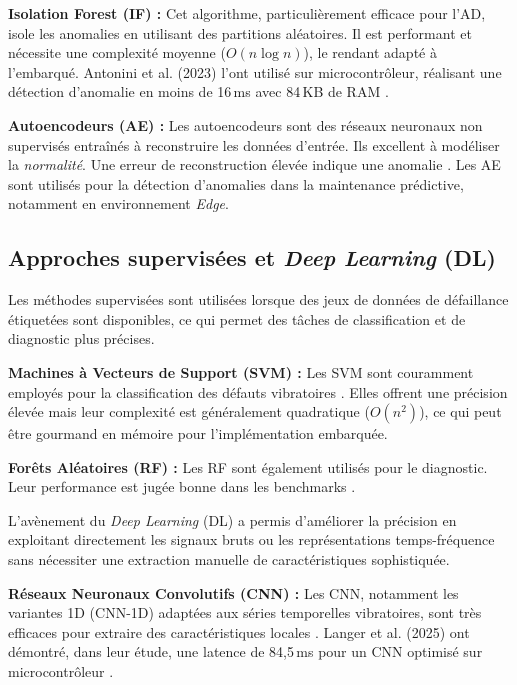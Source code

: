 \textbf{Isolation Forest (IF) :} Cet algorithme, particulièrement efficace pour l'AD, isole les anomalies en utilisant des partitions aléatoires. Il est performant et nécessite une complexité moyenne ($O(n \log n)$), le rendant adapté à l'embarqué. Antonini et al. (2023) l'ont utilisé sur microcontrôleur, réalisant une détection d'anomalie en moins de 16\,ms avec 84\,KB de RAM \cite{antonini2023}.

\textbf{Autoencodeurs (AE) :} Les autoencodeurs sont des réseaux neuronaux non supervisés entraînés à reconstruire les données d'entrée. Ils excellent à modéliser la \textit{normalité}. Une erreur de reconstruction élevée indique une anomalie \cite{ran2019}. Les AE sont utilisés pour la détection d'anomalies dans la maintenance prédictive, notamment en environnement \textit{Edge}.

\subsection{Approches supervisées et \textit{Deep Learning} (DL)}

Les méthodes supervisées sont utilisées lorsque des jeux de données de défaillance étiquetées sont disponibles, ce qui permet des tâches de classification et de diagnostic plus précises.

\textbf{Machines à Vecteurs de Support (SVM) :} Les SVM sont couramment employés pour la classification des défauts vibratoires \cite{jemmali2021,ran2019}. Elles offrent une précision élevée mais leur complexité est généralement quadratique ($O(n^2)$), ce qui peut être gourmand en mémoire pour l'implémentation embarquée.

\textbf{Forêts Aléatoires (RF) :} Les RF sont également utilisés pour le diagnostic. Leur performance est jugée bonne dans les benchmarks \cite{bagri2024}.

L'avènement du \textit{Deep Learning} (DL) a permis d'améliorer la précision en exploitant directement les signaux bruts ou les représentations temps-fréquence sans nécessiter une extraction manuelle de caractéristiques sophistiquée.

\textbf{Réseaux Neuronaux Convolutifs (CNN) :} Les CNN, notamment les variantes 1D (CNN-1D) adaptées aux séries temporelles vibratoires, sont très efficaces pour extraire des caractéristiques locales \cite{bagri2024,langer2025}. Langer et al. (2025) ont démontré, dans leur étude, une latence de 84,5\,ms pour un CNN optimisé sur microcontrôleur \cite{langer2025}.

